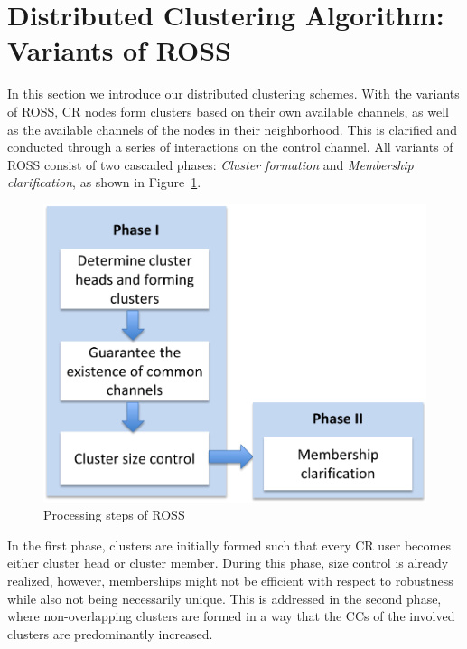 \documentclass[times]{ettauth}
\theoremstyle{mytheoremstyle}
\theoremstyle{mytheoremstyle}
\theoremstyle{mytheoremstyle}
\begin{document}
\section{Distributed Clustering Algorithm: Variants of ROSS}
\label{ross}

In this section we introduce our distributed clustering schemes.
With the variants of ROSS, CR nodes form clusters based on their own available channels, as well as the available channels of the nodes in their neighborhood.
This is clarified and conducted through a series of interactions on the control channel.
All variants of ROSS consist of two cascaded phases: \textit{Cluster formation} and \textit{Membership clarification}, as shown in Figure~\ref{flowChartROSS}.
\begin{figure}[ht!]
  \centering
\includegraphics[width=0.9\linewidth]{flow_chart.pdf}
	\caption{Processing steps of ROSS}
	\label{flowChartROSS}
\end{figure}
In the first phase, clusters are initially formed such that every CR user becomes either cluster head or cluster member.
During this phase, size control is already realized, however, memberships might not be efficient with respect to robustness while also not being necessarily unique.
This is addressed in the second phase, where non-overlapping clusters are formed in a way that the CCs of the involved clusters are predominantly increased.
\end{document}
